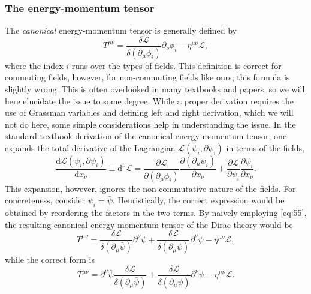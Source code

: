 \subsubsection{The energy-momentum tensor}
The \emph{canonical} energy-momentum tensor is generally defined by
\begin{equation}
  \label{eq:55}
  T^{\mu \nu} =  \frac{\delta \mathcal{L}}{\delta(\partial_{\mu} \phi_{i})} \partial_{\nu} \phi_i - \eta^{\mu \nu} \mathcal{L},
\end{equation}
where the index \( i \) runs over the types of fields.
This definition is correct for commuting fields, however, for non-commuting fields like ours, this formula is slightly wrong.
This is often overlooked in many textbooks and papers, so we will here elucidate the issue to some degree.
While a proper derivation requires the use of Grassman variables and defining left and right derivation, which we will not do here, some simple considerations help in understanding the issue.
In the standard textbook derivation of the canonical energy-momentum tensor, one expands the total derivative of the Lagrangian \( \mathcal{L}(\psi_i, \partial \psi_i)\) in terms of the fields,
\begin{equation}
  \label{eq:56}
  \frac{\mathrm{d} \mathcal{L}(\psi_{i}, \partial \psi_i)}{\mathrm{d} x_{\nu }} \equiv \mathrm{d}^{\nu } \mathcal{L}
  = \frac{\partial \mathcal{L}}{\partial (\partial_{\mu } \phi_i)} \frac{\partial(\partial _{\mu } \psi_i)}{\partial x_{\nu }}
  + \frac{\partial \mathcal{L}}{\partial \psi _{i}} \frac{\partial \psi_i}{\partial x_{\nu }}.
\end{equation}
This expansion, however, ignores the non-commutative nature of the fields.
For concreteness, consider \( \psi _i = \bar{\psi} \).
Heuristically, the correct expression would be obtained by reordering the factors in the two terms.
By naively employing \cref{eq:55}, the resulting canonical energy-momentum tensor of the Dirac theory would be
\begin{equation}
  T^{\mu \nu} = \frac{\delta \mathcal{L}}{\delta (\partial_{\mu} \bar{\psi})} \partial^{\nu} \bar{\psi}  + \frac{\delta \mathcal{L}}{\delta (\partial_{\mu} \psi)} \partial^{\nu} \psi - \eta^{\mu \nu} \mathcal{L},
\end{equation}
while the correct form is~\cite[Eq.~3-153]{itzyksonQuantumFieldTheory1980}
\begin{equation}
  \label{eq:57}
  T^{\mu \nu} = \partial^{\nu} \bar{\psi} \frac{\delta \mathcal{L}}{\delta (\partial_{\mu} \bar{\psi})} + \frac{\delta \mathcal{L}}{\delta (\partial_{\mu} \psi)} \partial^{\nu} \psi - \eta^{\mu \nu} \mathcal{L}.
\end{equation}

